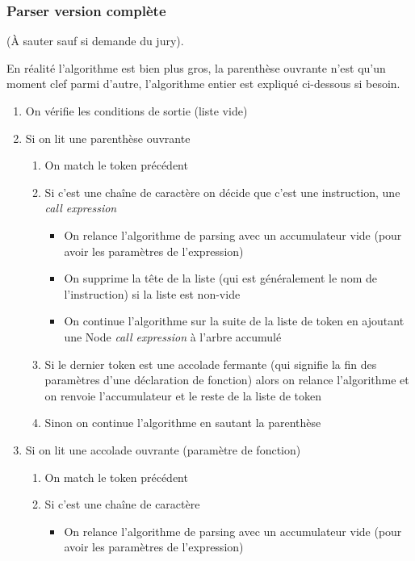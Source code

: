 \documentclass{beamer}
\begin{document}
    \begin{frame}[allowframebreaks]
        \frametitle{Parser version complète}
        (À sauter sauf si demande du jury).

        En réalité l'algorithme est bien plus gros, la parenthèse ouvrante n'est qu'un moment clef parmi d'autre, l'algorithme entier est expliqué ci-dessous si besoin.
        \begin{enumerate}
            \item On vérifie les conditions de sortie (liste vide)
            \item Si on lit une parenthèse ouvrante
            \begin{enumerate}
                \item On match le token précédent
                \item Si c'est une chaîne de caractère on décide que c'est une instruction, une \textit{call expression}
                \begin{itemize}
                    \item On relance l'algorithme de parsing avec un accumulateur vide (pour avoir les paramètres de l'expression)
                    \item On supprime la tête de la liste (qui est généralement le nom de l'instruction) si la liste est non-vide 
                    \item On continue l'algorithme sur la suite de la liste de token en ajoutant une Node \textit{call expression} à l'arbre accumulé
                \end{itemize}
                \item Si le dernier token est une accolade fermante (qui signifie la fin des paramètres d'une déclaration de fonction) alors on 
                relance l'algorithme et on renvoie l'accumulateur et le reste de la liste de token
                \item Sinon on continue l'algorithme en sautant la parenthèse
            \end{enumerate}
            \item Si on lit une accolade ouvrante (paramètre de fonction)
            \begin{enumerate}
                \item On match le token précédent
                \item Si c'est une chaîne de caractère
                \begin{itemize}
                    \item On relance l'algorithme de parsing avec un accumulateur vide (pour avoir les paramètres de l'expression)

\end{itemize}
\end{enumerate}
\end{enumerate}
\end{frame}
\end{document}
